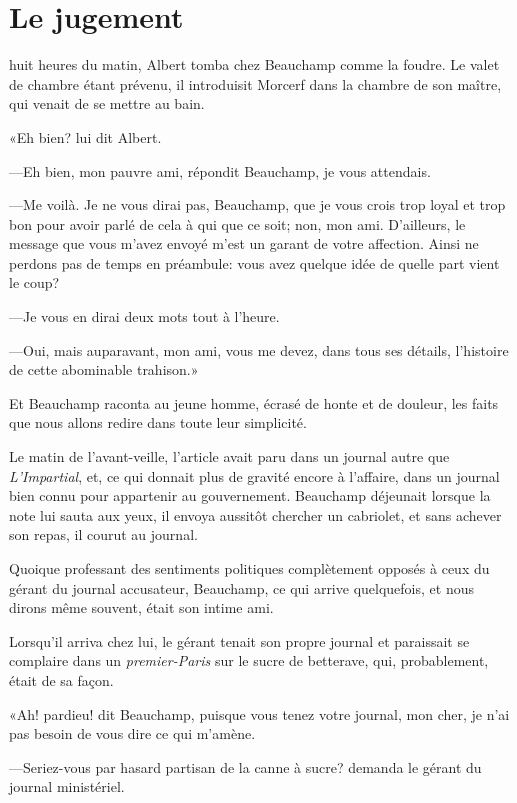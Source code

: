 \chapter{Le jugement} 

\lettrine{}{} huit heures du matin, Albert tomba chez Beauchamp comme la foudre. Le valet de chambre étant prévenu, il introduisit Morcerf dans la chambre de son maître, qui venait de se mettre au bain. 

\zz
«Eh bien? lui dit Albert. 

—Eh bien, mon pauvre ami, répondit Beauchamp, je vous attendais. 

—Me voilà. Je ne vous dirai pas, Beauchamp, que je vous crois trop loyal et trop bon pour avoir parlé de cela à qui que ce soit; non, mon ami. D'ailleurs, le message que vous m'avez envoyé m'est un garant de votre affection. Ainsi ne perdons pas de temps en préambule: vous avez quelque idée de quelle part vient le coup? 

—Je vous en dirai deux mots tout à l'heure. 

—Oui, mais auparavant, mon ami, vous me devez, dans tous ses détails, l'histoire de cette abominable trahison.» 

Et Beauchamp raconta au jeune homme, écrasé de honte et de douleur, les faits que nous allons redire dans toute leur simplicité. 

Le matin de l'avant-veille, l'article avait paru dans un journal autre que \textit{L'Impartial}, et, ce qui donnait plus de gravité encore à l'affaire, dans un journal bien connu pour appartenir au gouvernement. Beauchamp déjeunait lorsque la note lui sauta aux yeux, il envoya aussitôt chercher un cabriolet, et sans achever son repas, il courut au journal. 

Quoique professant des sentiments politiques complètement opposés à ceux du gérant du journal accusateur, Beauchamp, ce qui arrive quelquefois, et nous dirons même souvent, était son intime ami. 

Lorsqu'il arriva chez lui, le gérant tenait son propre journal et paraissait se complaire dans un \textit{premier-Paris} sur le sucre de betterave, qui, probablement, était de sa façon. 

«Ah! pardieu! dit Beauchamp, puisque vous tenez votre journal, mon cher, je n'ai pas besoin de vous dire ce qui m'amène. 

—Seriez-vous par hasard partisan de la canne à sucre? demanda le gérant du journal ministériel. 

